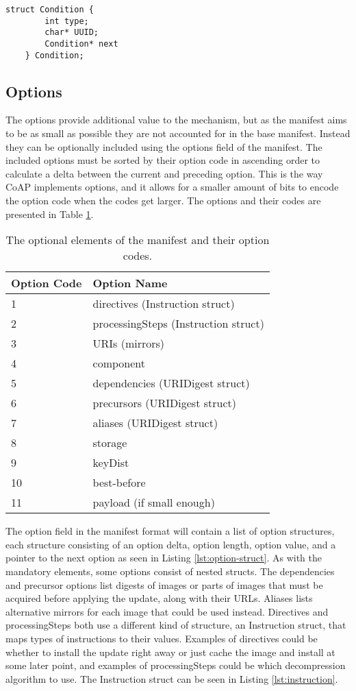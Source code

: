 \documentclass[0-thesis.tex]{subfiles}
\begin{document}
\begin{lstlisting}[language=blockc,
                    caption={The format of vendor, class, and device ID conditions.}, 
                    label={lst:condition-struct}]
    struct Condition {
        int type;
        char* UUID;
        Condition* next
    } Condition;
\end{lstlisting}

\subsection{Options}
\label{ssec:options}
The options provide additional value to the mechanism, but as the manifest aims to be as
small as possible they are not accounted for in the base manifest. Instead they can be
optionally included using the options field of the manifest. The included options must be
sorted by their option code in ascending order to calculate a delta between the current
and preceding option. This is the way CoAP implements options, and it allows for a
smaller amount of bits to encode the option code when the codes get larger. The options
and their codes are presented in Table \ref{tab:option-codes}.

\begin{longtable}[]{@{}ll@{}}
    \caption{The optional elements of the manifest and their option codes.}
    \label{tab:option-codes}\\
    \toprule
    Option Code & Option Name\tabularnewline
    \midrule
    \endhead
    1 & directives (Instruction struct)\tabularnewline
    2 & processingSteps (Instruction struct)\tabularnewline
    3 & URIs (mirrors)\tabularnewline
    4 & component\tabularnewline
    5 & dependencies (URIDigest struct)\tabularnewline
    6 & precursors (URIDigest struct)\tabularnewline
    7 & aliases (URIDigest struct)\tabularnewline
    8 & storage\tabularnewline
    9 & keyDist\tabularnewline
    10 & best-before\tabularnewline
    11 & payload (if small enough)\tabularnewline
    \bottomrule
\end{longtable}
    

The option field in the manifest format will contain a list of option structures, each
structure consisting of an option delta, option length, option value, and a pointer to the
next option as seen in Listing \ref{lst:option-struct}. As with the mandatory elements,
some options consist of nested structs. The dependencies and precursor options list
digests of images or parts of images that must be acquired before applying the update,
along with their URLs. Aliases lists alternative mirrors for each image that could be used
instead. Directives and processingSteps both use a different kind of structure, an
Instruction struct, that maps types of instructions to their values. Examples of
directives could be whether to install the update right away or just cache the image and
install at some later point, and examples of processingSteps could be which decompression
algorithm to use. The Instruction struct can be seen in Listing \ref{lst:instruction}.
\end{document}
